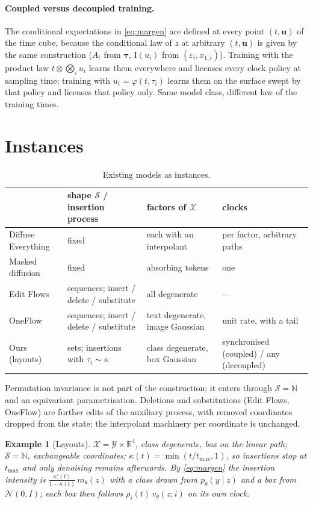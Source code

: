 \documentclass[11pt]{article}
\newtheorem{example}{Example}
\newcommand{\X}{\mathcal{X}}
\newcommand{\Sa}{\mathcal{S}}
\newcommand{\A}{A}
\newcommand{\N}{\mathbb{N}}
\newcommand{\R}{\mathbb{R}}
\newcommand{\bu}{\bm{u}}
\newcommand{\btau}{\bm{\tau}}
\newcommand{\Iu}{\mathrm{I}}
\begin{document}
\paragraph{Coupled versus decoupled training.}
The conditional expectations in \eqref{eq:margen} are defined at every point $(t,\bu)$ of the time cube, because the conditional law of $z$ at arbitrary $(t,\bu)$ is given by the same construction ($\A_t$ from $\btau$, $\Iu(u_i)$ from $(\varepsilon_i,x_{1,i})$). Training with the product law $t\otimes\bigotimes_i u_i$ learns them everywhere and licenses every clock policy at sampling time; training with $u_i=\varphi(t,\tau_i)$ learns them on the surface swept by that policy and licenses that policy only. Same model class, different law of the training times.

\section{Instances}

\begin{table}[h]
\centering
\begin{tabular}{@{}llll@{}}
\toprule
 & shape $\Sa$ / insertion process & factors of $\X$ & clocks \\
\midrule
Diffuse Everything & fixed & each with an interpolant & per factor, arbitrary paths \\
Masked diffusion & fixed & absorbing tokens & one \\
Edit Flows & sequences; insert / delete / substitute & all degenerate & --- \\
OneFlow & sequences; insert / delete / substitute & text degenerate, image Gaussian & unit rate, with a tail \\
Ours (layouts) & sets; insertions with $\tau_i\sim\kappa$ & class degenerate, box Gaussian & synchronised (coupled) / any (decoupled) \\
\bottomrule
\end{tabular}
\caption{Existing models as instances.}
\end{table}

Permutation invariance is not part of the construction; it enters through $\Sa=\N$ and an equivariant parametrisation. Deletions and substitutions (Edit Flows, OneFlow) are further edits of the auxiliary process, with removed coordinates dropped from the state; the interpolant machinery per coordinate is unchanged.

\begin{example}[Layouts]
$\X=\mathcal Y\times\R^4$, class degenerate, box on the linear path; $\Sa=\N$, exchangeable coordinates; $\kappa(t)=\min(t/t_{\max},1)$, so insertions stop at $t_{\max}$ and only denoising remains afterwards. By \eqref{eq:margen} the insertion intensity is $\frac{\kappa'(t)}{1-\kappa(t)}\,m_\theta(z)$ with a class drawn from $p_\theta(y\mid z)$ and a box from $\mathcal N(0,I)$; each box then follows $\rho_i(t)\,v_\theta(z;i)$ on its own clock.
\end{example}
\end{document}
